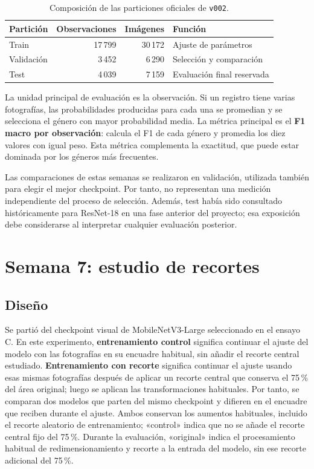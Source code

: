 \documentclass[11pt,a4paper]{article}
\begin{document}
\begin{table}[H]
\centering
\caption{Composición de las particiones oficiales de \texttt{v002}.}
\label{tab:particiones}
\begin{tabular}{lrrl}
\toprule
Partición & Observaciones & Imágenes & Función \\
\midrule
Train & 17\,799 & 30\,172 & Ajuste de parámetros \\
Validación & 3\,452 & 6\,290 & Selección y comparación \\
Test & 4\,039 & 7\,159 & Evaluación final reservada \\
\bottomrule
\end{tabular}
\end{table}

La unidad principal de evaluación es la observación. Si un registro tiene
varias fotografías, las probabilidades producidas para cada una se promedian y
se selecciona el género con mayor probabilidad media. La métrica principal es el
\textbf{F1 macro por observación}: calcula el F1 de cada género y promedia los
diez valores con igual peso. Esta métrica complementa la exactitud, que puede
estar dominada por los géneros más frecuentes.

Las comparaciones de estas semanas se realizaron en validación, utilizada
también para elegir el mejor checkpoint. Por tanto, no representan una medición
independiente del proceso de selección. Además, test había sido consultado
históricamente para ResNet-18 en una fase anterior del proyecto; esa exposición
debe considerarse al interpretar cualquier evaluación posterior.

\section{Semana 7: estudio de recortes}
\subsection{Diseño}
Se partió del checkpoint visual de MobileNetV3-Large seleccionado en el ensayo
C. En este experimento, \textbf{entrenamiento control} significa continuar el
ajuste del modelo con las fotografías en su encuadre habitual, sin añadir el
recorte central estudiado. \textbf{Entrenamiento con recorte} significa
continuar el ajuste usando esas mismas fotografías después de aplicar un
recorte central que conserva el 75\,\% del área original; luego se aplican las
transformaciones habituales. Por tanto, se comparan dos modelos que parten del
mismo checkpoint y difieren en el encuadre que reciben durante el ajuste.
Ambos conservan los aumentos habituales, incluido el recorte aleatorio de
entrenamiento; «control» indica que no se añade el recorte central fijo del
75\,\%. Durante la evaluación, «original» indica el procesamiento habitual
de redimensionamiento y recorte a la entrada del modelo, sin ese recorte
adicional del 75\,\%.
\end{document}
